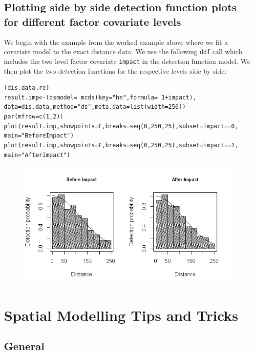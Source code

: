 \subsection{Plotting side by side detection function plots for different factor covariate levels}
\noindent We begin with the example from the worked example above where we fit a covariate model to the exact distance data. We use the following {\tt ddf} call which includes the two level factor covariate {\tt impact} in the detection function model. We then plot the two detection functions for the respective levels side by side: 
\begin{knitrout}\footnotesize
{}\color{fgcolor}\begin{kframe}
\begin{alltt}
(dis.data.re)
result.imp<-(dsmodel=~mcds(key="hn", formula=~1+impact), 
     data=dis.data, method="ds", meta.data=list(width=250))
par(mfrow=c(1,2))
plot(result.imp, showpoints=F, breaks=seq(0,250,25), subset=impact==0, 
    main="Before Impact")
plot(result.imp, showpoints=F, breaks=seq(0,250,25), subset=impact==1, 
    main="After Impact")
\end{alltt}
\end{kframe}
\end{knitrout}
\begin{figure}[h]
\includegraphics[width=12cm]{impactdetplot.png}
\end{figure}

\section{Spatial Modelling Tips and Tricks}
\subsection{General}

